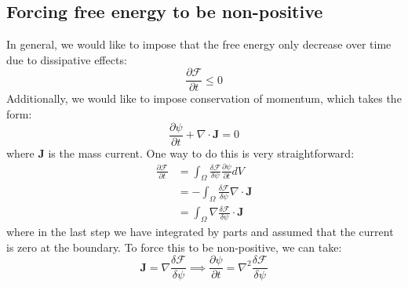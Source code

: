 \documentclass[reqno]{article}
\begin{document}
\subsection{Forcing free energy to be non-positive}
In general, we would like to impose that the free energy only decrease over time due to dissipative effects:
\begin{equation}
    \frac{\partial \mathcal{F}}{\partial t} \leq 0
\end{equation}
Additionally, we would like to impose conservation of momentum, which takes the form:
\begin{equation}
    \frac{\partial \psi}{\partial t} + \nabla \cdot \mathbf{J} = 0
\end{equation}
where $\mathbf{J}$ is the mass current.
One way to do this is very straightforward:
\begin{equation}
    \begin{split}
        \frac{\partial \mathcal{F}}{\partial t}
        &=
        \int_\Omega \frac{\delta \mathcal{F}}{\delta \psi} \frac{\partial \psi}{\partial t} dV \\
        &=
        -\int_\Omega \frac{\delta \mathcal{F}}{\delta \psi} \nabla \cdot \mathbf{J} \\
        &=
        \int_\Omega \nabla \frac{\delta \mathcal{F}}{\delta \psi} \cdot \mathbf{J}
    \end{split}
\end{equation}
where in the last step we have integrated by parts and assumed that the current is zero at the boundary.
To force this to be non-positive, we can take:
\begin{equation}
    \mathbf{J} = \nabla \frac{\delta \mathcal{F}}{\delta \psi}
    \implies
    \frac{\partial \psi}{\partial t} = \nabla^2 \frac{\delta \mathcal{F}}{\delta \psi}
\end{equation}
\end{document}
